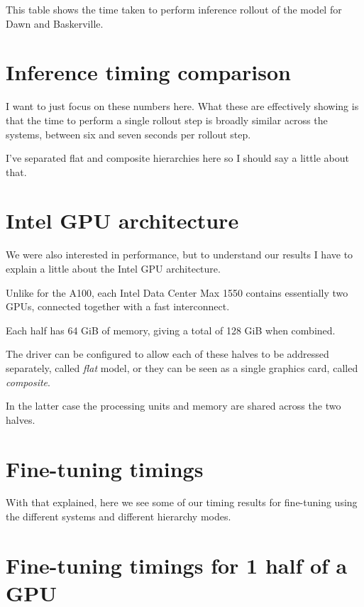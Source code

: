 \documentclass{article}
\begin{document}
This table shows the time taken to perform inference rollout of the model for Dawn and Baskerville.


\section{Inference timing comparison}

I want to just focus on these numbers here. What these are effectively showing is that the time to perform a single rollout step is broadly similar across the systems, between six and seven seconds per rollout step.

I've separated flat and composite hierarchies here so I should say a little about that.

\fi
\section{Intel GPU architecture}

We were also interested in performance, but to understand our results I have to explain a little about the Intel GPU architecture.

Unlike for the A100, each Intel Data Center Max 1550 contains essentially two GPUs, connected together with a fast interconnect.

Each half has 64 GiB of memory, giving a total of 128 GiB when combined.

The driver can be configured to allow each of these halves to be addressed separately, called {\it flat} model, or they can be seen as a single graphics card, called {\it composite}.

In the latter case the processing units and memory are shared across the two halves.


\section{Fine-tuning timings}

With that explained, here we see some of our timing results for fine-tuning using the different systems and different hierarchy modes.


\section{Fine-tuning timings for 1 half of a GPU}
\end{document}
